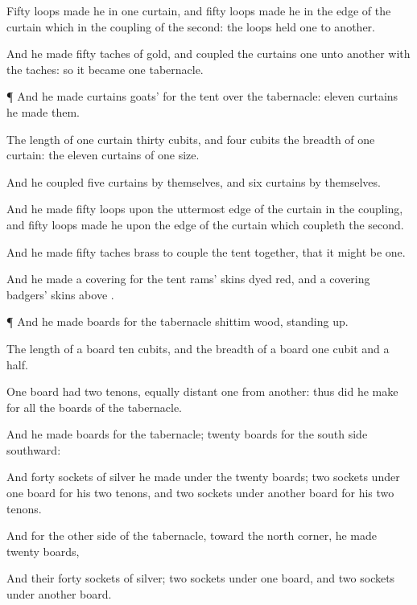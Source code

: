 {Fifty
loops
made he in
one
curtain, and
fifty
loops
made he in the
edge of the
curtain which
{} in the
coupling of the
second: the
loops
held
one
{} to
another.

And he
made
fifty
taches of
gold, and
coupled the
curtains
one unto
another with the
taches: so it became
one
tabernacle.


\par }{\PP {}¶ And he
made
curtains
{}
goats’
{} for the
tent over the
tabernacle:
eleven
curtains he
made them.

The
length of
one
curtain
{}
thirty
cubits, and
four
cubits
{} the
breadth of
one
curtain: the
eleven
curtains
{} of
one
size.

And he
coupled
five
curtains by themselves, and
six
curtains by themselves.

And he
made
fifty
loops upon the
uttermost
edge of the
curtain in the
coupling, and
fifty
loops
made he upon the
edge of the
curtain which
coupleth the
second.

And he
made
fifty
taches
{}
brass to
couple the
tent
together, that it might be
one.

And he
made a
covering for the
tent
{}
rams’
skins dyed
red, and a
covering
{}
badgers’
skins
above
{}.


\par }{\PP {}¶ And he
made
boards for the
tabernacle
{}
shittim
wood, standing
up.

The
length of a
board
{}
ten
cubits, and the
breadth of a
board
one
cubit and a
half.

One
board had
two
tenons, equally
distant
one
from
another: thus did he
make for all the
boards of the
tabernacle.

And he
made
boards for the
tabernacle;
twenty
boards for the
south
side
southward:

And
forty
sockets of
silver he
made under the
twenty
boards;
two
sockets under
one
board for his
two
tenons, and
two
sockets under
another
board for his
two
tenons.

And for the
other
side of the
tabernacle,
{} toward the
north
corner, he
made
twenty
boards,

And their
forty
sockets of
silver;
two
sockets under
one
board, and
two
sockets under
another
board.

}
